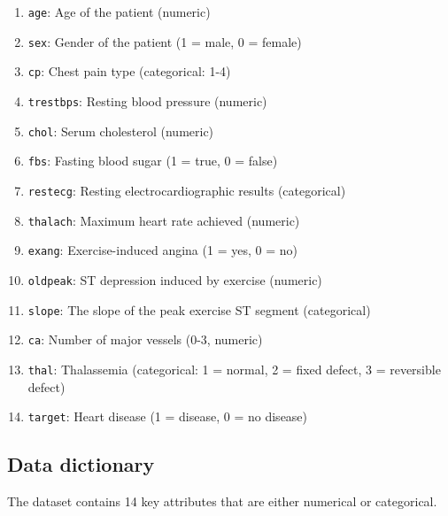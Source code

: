 \documentclass[
]{article}
\providecommand{\tightlist}{%
  \setlength{\itemsep}{0pt}\setlength{\parskip}{0pt}}
\begin{document}
\begin{enumerate}
\def\labelenumi{\arabic{enumi}.}
\tightlist
\item
  \texttt{age}: Age of the patient (numeric)
\item
  \texttt{sex}: Gender of the patient (1 = male, 0 = female)
\item
  \texttt{cp}: Chest pain type (categorical: 1-4)
\item
  \texttt{trestbps}: Resting blood pressure (numeric)
\item
  \texttt{chol}: Serum cholesterol (numeric)
\item
  \texttt{fbs}: Fasting blood sugar (1 = true, 0 = false)
\item
  \texttt{restecg}: Resting electrocardiographic results (categorical)
\item
  \texttt{thalach}: Maximum heart rate achieved (numeric)
\item
  \texttt{exang}: Exercise-induced angina (1 = yes, 0 = no)
\item
  \texttt{oldpeak}: ST depression induced by exercise (numeric)
\item
  \texttt{slope}: The slope of the peak exercise ST segment
  (categorical)
\item
  \texttt{ca}: Number of major vessels (0-3, numeric)
\item
  \texttt{thal}: Thalassemia (categorical: 1 = normal, 2 = fixed defect,
  3 = reversible defect)
\item
  \texttt{target}: Heart disease (1 = disease, 0 = no disease)
\end{enumerate}

\subsection{Data dictionary}\label{data-dictionary}

The dataset contains 14 key attributes that are either numerical or
categorical.
\end{document}
